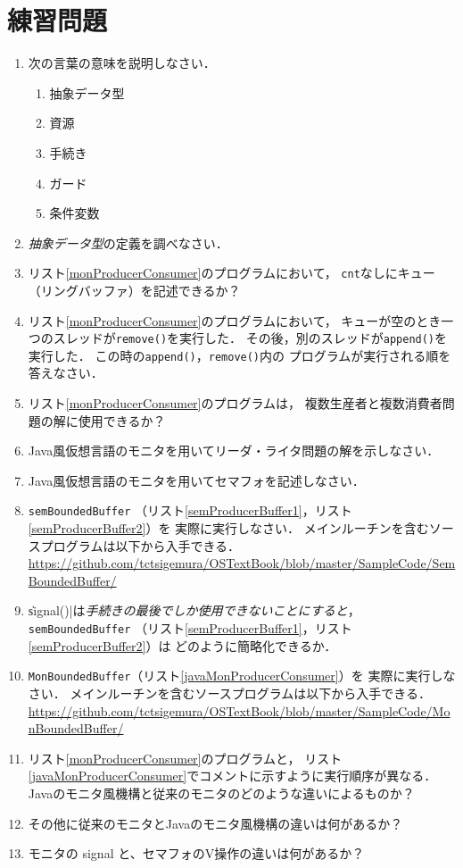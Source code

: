 \section*{練習問題}
\begin{enumerate}
  \renewcommand{\labelenumi}{\ttfamily\arabic{chapter}.\arabic{enumi}}
  \setlength{\leftskip}{1em}
\item 次の言葉の意味を説明しなさい．
  \begin{enumerate}
  \item 抽象データ型
  \item 資源
  \item 手続き
  \item ガード
  \item 条件変数
  \end{enumerate}
\item \emph{抽象データ型}の定義を調べなさい．
\item リスト\ref{monProducerConsumer}のプログラムにおいて，
  \texttt{cnt}なしにキュー（リングバッファ）を記述できるか？
\item リスト\ref{monProducerConsumer}のプログラムにおいて，
  キューが空のとき一つのスレッドが\texttt{remove()}を実行した．
  その後，別のスレッドが\texttt{append()}を実行した．
  この時の\texttt{append()}，\texttt{remove()}内の
  プログラムが実行される順を答えなさい．
\item リスト\ref{monProducerConsumer}のプログラムは，
  複数生産者と複数消費者問題の解に使用できるか？
\item Java風仮想言語のモニタを用いてリーダ・ライタ問題の解を示しなさい．
\item Java風仮想言語のモニタを用いてセマフォを記述しなさい．
\item \texttt{semBoundedBuffer}
  （リスト\ref{semProducerBuffer1}，リスト\ref{semProducerBuffer2}）を
  実際に実行しなさい．
  メインルーチンを含むソースプログラムは以下から入手できる． \\
  \url{https://github.com/tctsigemura/OSTextBook/blob/master/SampleCode/SemBoundedBuffer/}
\item \|signal()|は\emph{手続きの最後でしか使用できないことにすると}，
  \texttt{semBoundedBuffer}
  （リスト\ref{semProducerBuffer1}，リスト\ref{semProducerBuffer2}）は
  どのように簡略化できるか．
\item \texttt{MonBoundedBuffer}（リスト\ref{javaMonProducerConsumer}）を
  実際に実行しなさい．
  メインルーチンを含むソースプログラムは以下から入手できる．\\
  \url{https://github.com/tctsigemura/OSTextBook/blob/master/SampleCode/MonBoundedBuffer/}
\item リスト\ref{monProducerConsumer}のプログラムと，
  リスト\ref{javaMonProducerConsumer}でコメントに示すように実行順序が異なる．
  Javaのモニタ風機構と従来のモニタのどのような違いによるものか？
\item その他に従来のモニタとJavaのモニタ風機構の違いは何があるか？
\item モニタの signal と、セマフォのV操作の違いは何があるか？
\end{enumerate}
